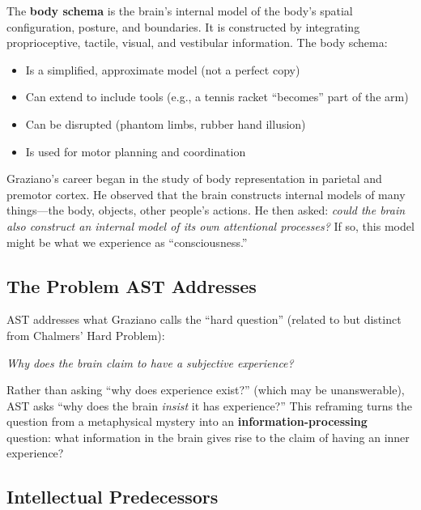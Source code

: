 \documentclass[11pt,a4paper]{report}
\begin{document}
\begin{definitionbox}
The \textbf{body schema} is the brain's internal model of the body's spatial configuration, posture, and boundaries. It is constructed by integrating proprioceptive, tactile, visual, and vestibular information. The body schema:
\begin{itemize}[leftmargin=1.5em]
  \item Is a simplified, approximate model (not a perfect copy)
  \item Can extend to include tools (e.g., a tennis racket ``becomes'' part of the arm)
  \item Can be disrupted (phantom limbs, rubber hand illusion)
  \item Is used for motor planning and coordination
\end{itemize}
\end{definitionbox}

Graziano's career began in the study of body representation in parietal and premotor cortex. He observed that the brain constructs internal models of many things---the body, objects, other people's actions. He then asked: \emph{could the brain also construct an internal model of its own attentional processes?} If so, this model might be what we experience as ``consciousness.''

\subsection{The Problem AST Addresses}

AST addresses what Graziano calls the ``hard question'' (related to but distinct from Chalmers' Hard Problem):

\emph{Why does the brain claim to have a subjective experience?}

Rather than asking ``why does experience exist?'' (which may be unanswerable), AST asks ``why does the brain \emph{insist} it has experience?'' This reframing turns the question from a metaphysical mystery into an \textbf{information-processing} question: what information in the brain gives rise to the claim of having an inner experience?

\subsection{Intellectual Predecessors}
\end{document}
